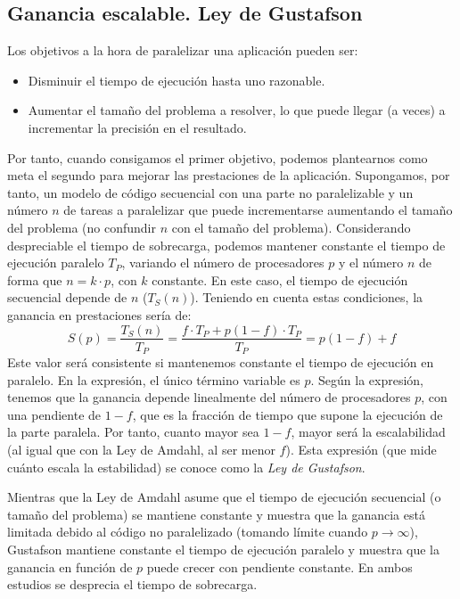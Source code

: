 \subsection{Ganancia escalable. Ley de Gustafson}
Los objetivos a la hora de paralelizar una aplicación pueden ser:
\begin{itemize}
    \item Disminuir el tiempo de ejecución hasta uno razonable.
    \item Aumentar el tamaño del problema a resolver, lo que puede llegar (a veces) a incrementar la precisión en el resultado.
\end{itemize}

Por tanto, cuando consigamos el primer objetivo, podemos plantearnos como meta el segundo para mejorar las prestaciones de la aplicación. Supongamos, por tanto, un modelo de código secuencial con una parte no paralelizable y un número $n$ de tareas a paralelizar que puede incrementarse aumentando el tamaño del problema (no confundir $n$ con el tamaño del problema). Considerando despreciable el tiempo de sobrecarga, podemos mantener constante el tiempo de ejecución paralelo $T_P$, variando el número de procesadores $p$ y el número $n$ de forma que $n=k\cdot p$, con $k$ constante. En este caso, el tiempo de ejecución secuencial depende de $n$ ($T_S(n)$). Teniendo en cuenta estas condiciones, la ganancia en prestaciones sería de:
\begin{equation}
    S(p) = \dfrac{T_S(n)}{T_P} = \dfrac{f\cdot T_P + p(1-f)\cdot T_P}{T_P} = p(1-f)+f
\end{equation}
Este valor será consistente si mantenemos constante el tiempo de ejecución en paralelo. En la expresión, el único término variable es $p$. Según la expresión, tenemos que la ganancia depende linealmente del número de procesadores $p$, con una pendiente de $1-f$, que es la fracción de tiempo que supone la ejecución de la parte paralela. Por tanto, cuanto mayor sea $1-f$, mayor será la escalabilidad (al igual que con la Ley de Amdahl, al ser menor $f$). Esta expresión (que mide cuánto escala la estabilidad) se conoce como la \emph{Ley de Gustafson}.

Mientras que la Ley de Amdahl asume que el tiempo de ejecución secuencial (o tamaño del problema) se mantiene constante y muestra que la ganancia está limitada debido al código no paralelizado (tomando límite cuando $p\to\infty$), Gustafson mantiene constante el tiempo de ejecución paralelo y muestra que la ganancia en función de $p$ puede crecer con pendiente constante. En ambos estudios se desprecia el tiempo de sobrecarga.

